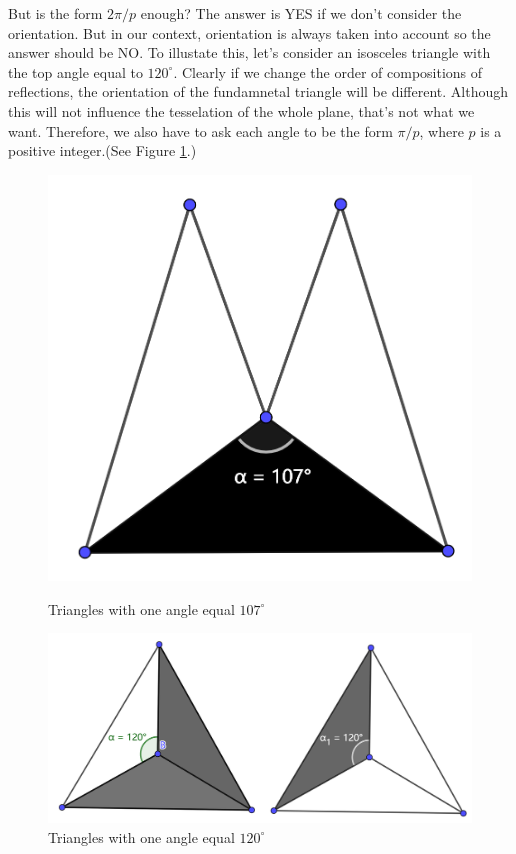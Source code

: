 \documentclass{article}
\begin{document}
But is the form $2\pi/p$ enough? The answer is YES if we don't
consider the orientation. But in our context, orientation is always
taken into account so the answer should be NO. To illustate this,
let's consider an isosceles triangle with the top angle equal to $120^{\circ}$.
Clearly if we change the order of compositions of reflections,
the orientation of the fundamnetal triangle will be different.
Although this will not influence the tesselation of the whole plane,
that's not what we want. Therefore, we also have to ask each angle
to be the form $\pi/p$, where $p$ is a positive integer.(See Figure \ref{120}.)
\begin{figure}[htbp]
    \begin{minipage}{0.32\linewidth}
        \includegraphics[width={0.9\linewidth}]{107.png}
        \centering
        \caption{Triangles with one angle equal $107^{\circ}$}
        \label{107}
    \end{minipage}
    \begin{minipage}{0.65\linewidth}
        \includegraphics[width={0.9\linewidth}]{120.png}
        \centering
        \caption{Triangles with one angle equal $120^{\circ}$}
        \label{120}
    \end{minipage}
\end{figure}
\end{document}
